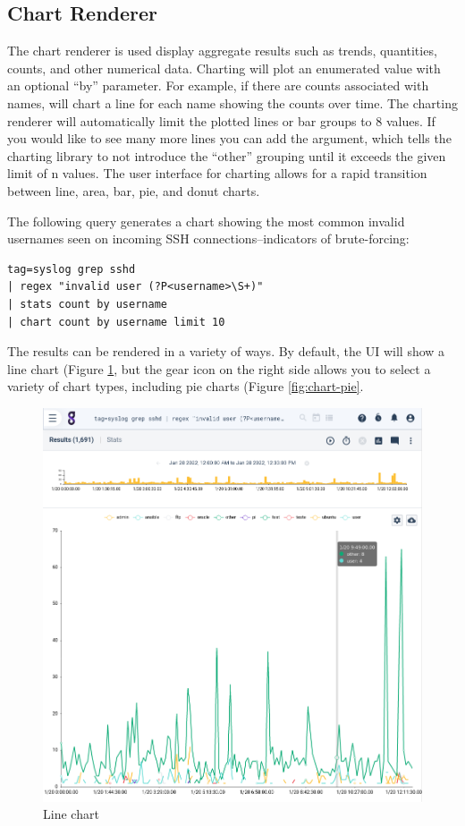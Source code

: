 \clearpage

\subsection{Chart Renderer}
The chart renderer is used display aggregate results such as trends,
quantities, counts, and other numerical data. Charting will plot an
enumerated value with an optional ``by'' parameter. For example, if
there are counts associated with names,  will
chart a line for each name showing the counts over time. The charting
renderer will automatically limit the plotted lines or bar groups to 8
values. If you would like to see many more lines you can add the 
argument, which tells the charting library
to not introduce the ``other'' grouping until it exceeds the given limit
of n values. The user interface for charting allows for a rapid
transition between line, area, bar, pie, and donut charts.

The following query generates a chart showing the most common invalid usernames seen on incoming SSH connections--indicators of brute-forcing:

\begin{Verbatim}[breaklines=true]
tag=syslog grep sshd 
| regex "invalid user (?P<username>\S+)" 
| stats count by username 
| chart count by username limit 10
\end{Verbatim}

The results can be rendered in a variety of ways. By default, the UI will show a line chart (Figure \ref{fig:chart-line}, but the gear icon on the right side allows you to select a variety of chart types, including pie charts (Figure \ref{fig:chart-pie}.

\begin{figure}
	\includegraphics[width=0.6\linewidth]{images/chart-line.png}
	\caption{Line chart}
	\label{fig:chart-line}
\end{figure}


